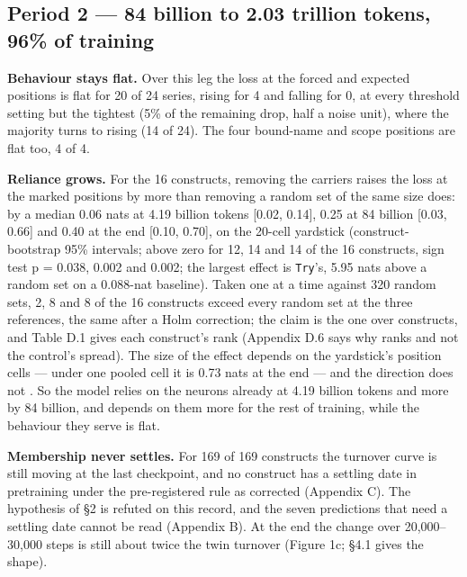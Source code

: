 \documentclass{article}
\begin{document}
\subsection{Period 2 --- 84 billion to 2.03 trillion tokens, 96\% of training}

\textbf{Behaviour stays flat.} Over this leg the loss at the forced and expected positions is flat for 20 of 24 series, rising for 4 and falling for 0, at every threshold setting but the tightest (5\% of the remaining drop, half a noise unit), where the majority turns to rising (14 of 24). The four bound-name and scope positions are flat too, 4 of 4.

\textbf{Reliance grows.} For the 16 constructs, removing the carriers raises the loss at the marked positions by more than removing a random set of the same size does: by a median 0.06 nats at 4.19 billion tokens [0.02, 0.14], 0.25 at 84 billion [0.03, 0.66] and 0.40 at the end [0.10, 0.70], on the 20-cell yardstick (construct-bootstrap 95\% intervals; above zero for 12, 14 and 14 of the 16 constructs, sign test p = 0.038, 0.002 and 0.002; the largest effect is \texttt{Try}'s, 5.95 nats above a random set on a 0.088-nat baseline). Taken one at a time against 320 random sets, 2, 8 and 8 of the 16 constructs exceed every random set at the three references, the same after a Holm correction; the claim is the one over constructs, and Table D.1 gives each construct's rank (Appendix D.6 says why ranks and not the control's spread). The size of the effect depends on the yardstick's position cells --- under one pooled cell it is 0.73 nats at the end --- and the direction does not \citep[\S4.3]{wilam2026}. So the model relies on the neurons already at 4.19 billion tokens and more by 84 billion, and depends on them more for the rest of training, while the behaviour they serve is flat.

\textbf{Membership never settles.} For 169 of 169 constructs the turnover curve is still moving at the last checkpoint, and no construct has a settling date in pretraining under the pre-registered rule as corrected (Appendix C). The hypothesis of \S2 is refuted on this record, and the seven predictions that need a settling date cannot be read (Appendix B). At the end the change over 20,000--30,000 steps is still about twice the twin turnover (Figure 1c; \S4.1 gives the shape).
\end{document}
